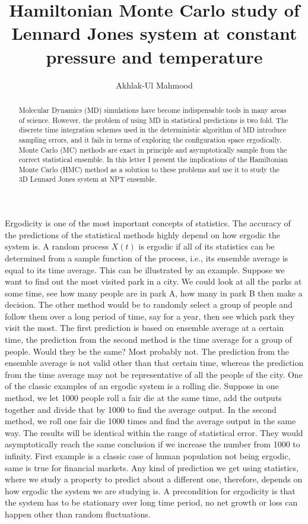 \documentclass[aps,prl,reprint]{revtex4-1}
\begin{document}
\title{Hamiltonian Monte Carlo study of Lennard Jones system at constant pressure and temperature}
\author{Akhlak-Ul Mahmood}

\begin{abstract}
Molecular Dynamics (MD) simulations have become indispensable tools in many areas of science. However, the problem of using MD in statistical predictions is two fold. The discrete time integration schemes used in the deterministic algorithm of MD introduce sampling errors, and it fails in terms of exploring the configuration space ergodically. Monte Carlo (MC) methods are exact in principle and asymptotically sample from the correct statistical ensemble. In this letter I present the implications of the Hamiltonian Monte Carlo (HMC) method as a solution to these problems and use it to study the 3D Lennard Jones system at NPT ensemble.
\end{abstract}

\maketitle

Ergodicity is one of the most important concepts of statistics. The accuracy of the predictions of the statistical methods highly depend on how ergodic the system is. A random process $X(t)$ is ergodic if all of its statistics can be determined from a sample function of the process, i.e., its ensemble average is equal to its time average. This can be illustrated by an example. Suppose we want to find out the most visited park in a city. We could look at all the parks at some time, see how many people are in park A, how many in park B then make a decision. The other method would be to randomly select a group of people and follow them over a long period of time, say for a year, then see which park they visit the most. The first prediction is based on ensemble average at a certain time, the prediction from the second method is the time average for a group of people. Would they be the same? Most probably not. The prediction from the ensemble average is not valid other than that certain time, whereas the prediction from the time average may not be representative of all the people of the city. One of the classic examples of an ergodic system is a rolling die. Suppose in one method, we let 1000 people roll a fair die at the same time, add the outputs together and divide that by 1000 to find the average output. In the second method, we roll one fair die 1000 times and find the average output in the same way. The results will be identical within the range of statistical error. They would asymptotically reach the same conclusion if we increase the number from 1000 to infinity. First example is a classic case of human population not being ergodic, same is true for financial markets. Any kind of prediction we get using statistics, where we study a property to predict about a different one, therefore, depends on how ergodic the system we are studying is. A precondition for ergodicity is that the system has to be stationary over long time period, no net growth or loss can happen other than random fluctuations. 
\end{document}
